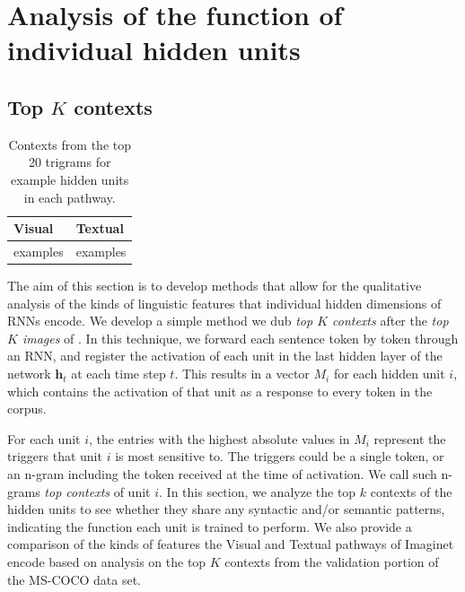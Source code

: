 \section{Analysis of the function of individual hidden units}
\label{sec:micro}

\subsection{Top $K$ contexts}
\label{sec:topk}

\begin{table}[t]
\small
\caption{Contexts from the top 20 trigrams for example hidden units in each pathway.}
\label{tab:contexts}
\vspace{.2cm}
\centering
    \begin{tabular}{ | p{6cm} | p{6cm}|}
    \hline
    {\sc Visual} & {\sc Textual} \\
    \hline
   examples & examples  \\
   \hline
   \end{tabular}
\end{table}


The aim of this section is to develop methods that allow
for the qualitative analysis of the kinds of linguistic features
that individual hidden dimensions of RNNs encode. 
We develop a simple method we dub {\it top $K$ contexts} 
after the {\it top $K$ images} of .
In this technique, we forward each sentence
token by token through an RNN, and register the activation 
of each unit in the last hidden layer of the network $\mathbf{h}_{t}$
at each time step $t$. This results in a vector $M_i$ 
for each hidden unit $i$, which contains  the activation of that unit 
as a response to every token in the corpus.

For each unit $i$, the entries with the highest absolute values in 
$M_i$ represent the triggers that unit $i$ is most sensitive to. The 
triggers could be a single token, or an n-gram including the token 
received at the time of activation. We call such n-grams {\it top 
contexts} of unit $i$. In this section, we analyze the top $k$ contexts
of the hidden units to see whether they share any syntactic and/or 
semantic patterns, indicating the function each unit is trained to perform.
We also provide a comparison of the kinds of features the {\sc Visual} and 
{\sc Textual} pathways of {\sc Imaginet} encode based on analysis on the 
top $K$ contexts from the validation portion of the MS-COCO data set. 

